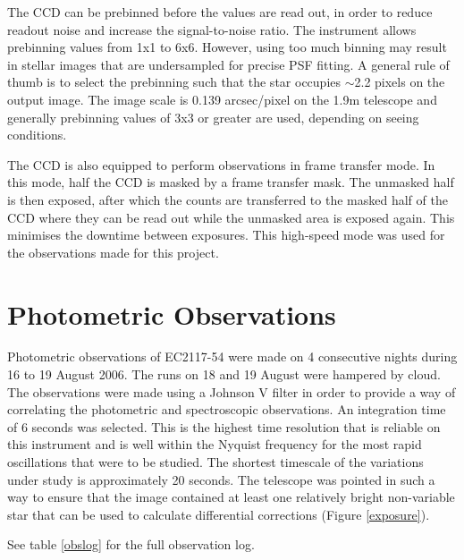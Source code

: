 The CCD can be prebinned before the values are read out, in order to reduce readout noise and increase the signal-to-noise ratio. The instrument allows prebinning values from 1x1 to 6x6. However, using too much binning may result in stellar images that are undersampled for precise PSF fitting. A general rule of thumb is to  select the prebinning such that the star occupies $\sim$2.2 pixels on the output image. The image scale is 0.139 arcsec/pixel on the 1.9m telescope and generally prebinning values of 3x3 or greater are used, depending on seeing conditions.

The CCD is also equipped to perform observations in frame transfer mode. In this mode, half the CCD is masked by a frame transfer mask. The unmasked half is then exposed, after which the counts are transferred to the masked half of the CCD where they can be read out while the unmasked area is exposed again. This minimises the downtime between exposures. This high-speed mode was used for the observations made for this project.




\section{Photometric Observations}
\label{sub_observations}
Photometric observations of EC2117-54 were made on 4 consecutive nights during 16 to 19 August 2006. The runs on 18 and 19 August were hampered by cloud.  The observations were made using a Johnson V filter in order to provide a way of correlating the photometric and spectroscopic observations. An integration time of 6 seconds was selected. This is the highest time resolution that is reliable on this instrument and is well within the Nyquist frequency for the most rapid oscillations that were to be studied.  The shortest timescale of the variations under study is approximately 20 seconds. The telescope was pointed in such a way to ensure that the image contained at least one relatively bright non-variable star that can be used to calculate differential corrections (Figure \ref{exposure}).

See table \ref{obslog} for the full observation log.

